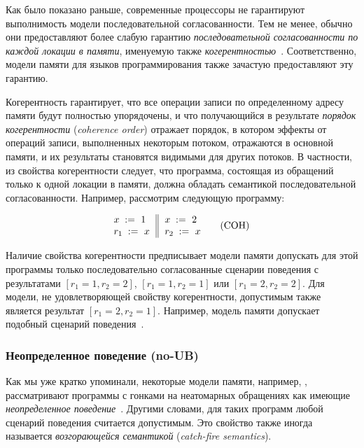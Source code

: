 Как было показано раньше, современные процессоры
не гарантируют выполнимость модели последовательной согласованности. 
Тем не менее, обычно они предоставляют более слабую 
гарантию \emph{последовательной согласованности 
по каждой локации в памяти}, именуемую также 
\emph{когерентностью}~\cite{Alglave-al:TOPLAS14}. 
Соответственно, модели памяти 
для языков программирования также зачастую предоставляют эту гарантию.

Когерентность гарантирует, что все операции записи 
по определенному адресу памяти будут полностью упорядочены,
и что получающийся в результате \emph{порядок когерентности} 
(\emph{coherence order}) отражает порядок, 
в котором эффекты от операций записи, выполненных некоторым потоком, 
отражаются в основной памяти, и их результаты становятся видимыми для других потоков.
В частности, из свойства когерентности следует, 
что программа, состоящая из обращений только 
к одной локации в памяти, должна 
обладать семантикой последовательной согласованности.
Например, рассмотрим следующую программу:

\begin{equation*}
\inarrII{
   \writeInst{}{x}{1}   \\
   \readInst{}{r_1}{x}  \\
}{
   \writeInst{}{x}{2}   \\
   \readInst{}{r_2}{x}  \\
}
\tag{COH}\label{ex:coh}
\end{equation*}

Наличие свойства когерентности предписывает модели памяти 
допускать для этой программы только последовательно 
согласованные сценарии поведения с результатами
${[r_1=1, r_2=2]}$, ${[r_1=1, r_2=1]}$ или ${[r_1=2, r_2=2]}$.
Для модели, не удовлетворяющей свойству когерентности, 
допустимым также является результат ${[r_1=2, r_2=1]}$.
Например, модель памяти \Java допускает подобный сценарий поведения~\cite{Manson-al:POPL05}.

\subsubsection{Неопределенное поведение (no-UB)}
\label{sec:background:ub}

Как мы уже кратко упоминали, некоторые модели памяти, например, \CPP, рассматривают программы с гонками на неатомарных обращениях как имеющие 
\emph{неопределенное поведение}~\cite{Boehm-Adve:PLDI08}.
Другими словами, для таких программ любой сценарий поведения считается допустимым. 
Это свойство также иногда называется 
\emph{возгорающейся семантикой} (\emph{catch-fire semantics}).
 

